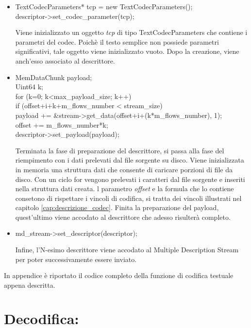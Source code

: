 \begin{itemize}
 \item \begin{code}
TextCodecParameters* tcp = new TextCodecParameters();\\
descriptor->set\_codec\_parameter(tcp);\\
\end{code}
Viene inizializzato un oggetto \textit{tcp} di tipo TextCodecParameters che
contiene i parametri del codec. Poichè il testo semplice non possiede parametri significativi, tale oggetto viene inizializzato vuoto. Dopo la creazione, viene anch'esso associato al descrittore.

 \item \begin{code}
MemDataChunk payload;\\
Uint64 k;\\
for (k=0; k<max\_payload\_size; k++)\\
	if (offset+i+k+m\_flows\_number < stream\_size)\\
		payload += \&stream->get\_data(offset+i+(k*m\_flows\_number), 1);\\
offset += m\_flows\_number*k;\\
descriptor->set\_payload(payload);\\
\end{code}
Terminata la fase di preparazione del descrittore, si passa alla fase del
riempimento con i dati prelevati dal file sorgente su disco. Viene inizializzata in memoria una struttura dati che consente di caricare porzioni di file da disco. Con un ciclo for vengono prelevati i caratteri dal file sorgente e inseriti nella struttura dati creata. l parametro \textit{offset} e la formula che lo contiene consetono di rispettare i vincoli di codifica, si tratta dei vincoli illustrati nel capitolo \ref{cap:descrizione_codec}. Finita la preparazione del payload, quest'ultimo viene accodato al descrittore che adesso risulterà completo.

 \item \begin{code}
md\_stream->set\_descriptor(descriptor);\\
\end{code}
Infine, l'N-esimo descrittore viene accodato al Multiple Description Stream per poter successivamente essere inviato.
\end{itemize}
In appendice è riportato il codice completo della funzione di codifica testuale
appena descritta.

\section{Decodifica:}


